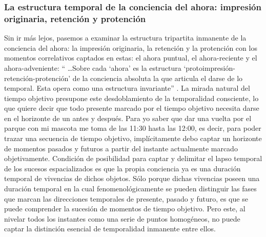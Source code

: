 \subsubsection{La estructura temporal de la conciencia del ahora: impresión originaria, retención y protención}\label{sec:estructura-tripartita}

Sin ir más lejos, pasemos a examinar la estructura tripartita inmanente
de la conciencia del ahora: la impresión originaria, la retención y la
protención con los momentos correlativos captados en estas: el ahora
puntual, el ahora-reciente y el ahora-adveniente: `` \ldots Sobre
cada `ahora' es la estructura `protoimpresión-retención-protención' de
la conciencia absoluta la que articula el darse de lo temporal. Esta
opera como una estructura invariante'' \cite[p.~251]{kretschel2014}. La mirada
natural del tiempo objetivo presupone este desdoblamiento de la
temporalidad consciente, lo que quiere decir que todo presente marcado
por el tiempo objetivo necesita darse en el horizonte de un antes y
después. Para yo saber que dar una vuelta por el parque con mi mascota
me toma de las 11:30 hasta las 12:00, es decir, para poder trazar una
secuencia de tiempo objetivo, implícitamente debo captar un horizonte de
momentos pasados y futuros a partir del instante actualmente marcado
objetivamente. Condición de posibilidad para captar y delimitar el lapso
temporal de los sucesos espacializados es que la propia conciencia ya es
una duración temporal de vivencias de dichos objetos. Sólo porque dichas
vivencias poseen una duración temporal en la cual fenomenológicamente se
pueden distinguir las fases que marcan las direcciones temporales de
presente, pasado y futuro, es que se puede comprender la sucesión de
momentos de tiempo objetivo. Pero este, al nivelar todos los instantes
como una serie de puntos homogéneos, no puede captar la distinción
esencial de temporalidad inmanente entre ellos.

